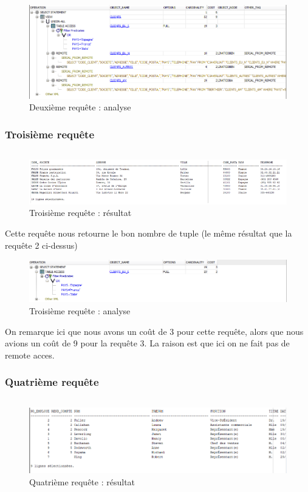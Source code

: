 \documentclass[10pt,a4paper]{article}
\theoremstyle{plain}
\begin{document}
\begin{figure}[H]
    \centering
    \includegraphics[width=15cm]{EUS_req2_analyse.png}
    \caption{Deuxième requête : analyse}
\end{figure}
\newpage

\subsubsection{Troisième requête}
\inputminted{sql}{EUS_IV-A-3.sql}
\begin{figure}[H]
    \centering
    \includegraphics[width=15cm]{EUS_req3.png}
    \caption{Troisième requête : résultat}
\end{figure}
Cette requête nous retourne le bon nombre de tuple (le même résultat que la requête 2 ci-dessus)

\begin{figure}[H]
    \centering
    \includegraphics[width=15cm]{EUS_req3_analyse.png}
    \caption{Troisième requête : analyse}
\end{figure}
On remarque ici que nous avons un coût de 3 pour cette requête, alors que nous avions un coût de 9 pour la requête 3. La raison est que ici on ne fait pas de remote acces.
\newpage

\subsubsection{Quatrième requête}
\inputminted{sql}{EUS_IV-A-4.sql}
\begin{figure}[H]
    \centering
    \includegraphics[width=15cm]{EUS_req4.png}
    \caption{Quatrième requête : résultat}
\end{figure}
\end{document}
